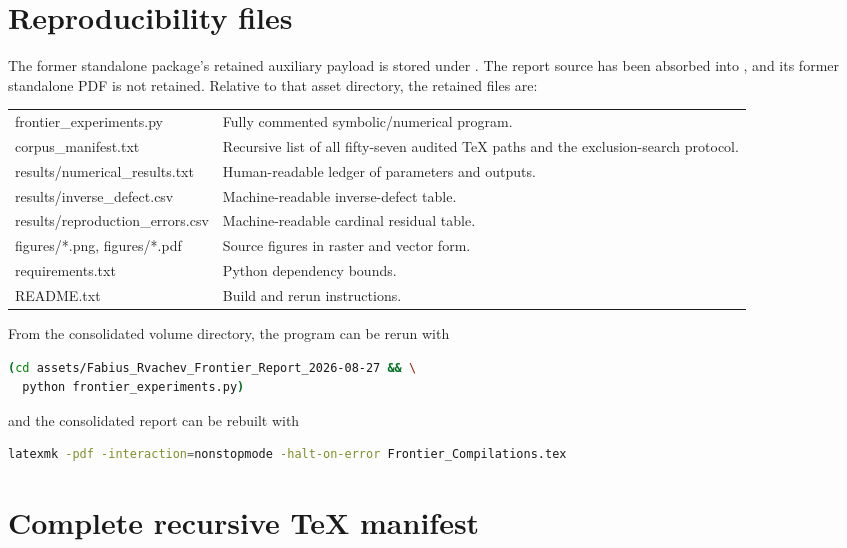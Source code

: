 \documentclass[11pt]{article}
\numberwithin{equation}{section}
\theoremstyle{definition}
\theoremstyle{remark}
\begin{document}
\section{Reproducibility files}
\label{p4:app:reproducibility}
The former standalone package's retained auxiliary payload is stored under
.  The report source has been
absorbed into , and its former standalone PDF is not retained.
Relative to that asset directory, the retained files are:
\begin{center}
\begin{tabularx}{0.96\textwidth}{@{}>{\footnotesize\ttfamily\raggedright\arraybackslash}p{}X@{}}
\toprule
frontier\_experiments.py & Fully commented symbolic/numerical program.\\
corpus\_manifest.txt & Recursive list of all fifty-seven audited TeX paths and the exclusion-search protocol.\\
results/numerical\_results.txt & Human-readable ledger of parameters and outputs.\\
results/inverse\_defect.csv & Machine-readable inverse-defect table.\\
results/reproduction\_errors.csv & Machine-readable cardinal residual table.\\
figures/*.png, figures/*.pdf & Source figures in raster and vector form.\\
requirements.txt & Python dependency bounds.\\
README.txt & Build and rerun instructions.\\
\bottomrule
\end{tabularx}
\end{center}
From the consolidated volume directory, the program can be rerun with
\begin{lstlisting}[style=code,language=bash]
(cd assets/Fabius_Rvachev_Frontier_Report_2026-08-27 && \
  python frontier_experiments.py)
\end{lstlisting}
and the consolidated report can be rebuilt with
\begin{lstlisting}[style=code,language=bash]
latexmk -pdf -interaction=nonstopmode -halt-on-error Frontier_Compilations.tex
\end{lstlisting}

\section{Complete recursive TeX manifest}
\label{p4:app:manifest}

\end{document}
